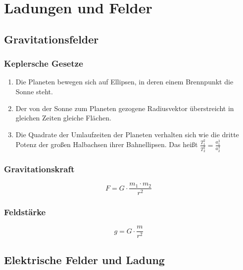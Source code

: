 \documentclass[a4paper]{article}
\begin{document}
	
	\section{Ladungen und Felder}	
		\subsection{Gravitationsfelder}
			\subsubsection{Keplersche Gesetze}
	
				\begin{enumerate}
					\item Die Planeten bewegen sich auf Ellipsen, in deren einem Brennpunkt die Sonne steht.
					\item Der von der Sonne zum Planeten gezogene Radiusvektor überstreicht in gleichen Zeiten gleiche Flächen.
					\item Die Quadrate der Umlaufzeiten der Planeten verhalten sich wie die dritte Potenz der großen Halbachsen ihrer Bahnellipsen. Das heißt $\frac{T_1^2}{T_2^2} = \frac{a_1^3}{a_2^3}$
				\end{enumerate}

			\subsubsection{Gravitationskraft}
	
				\begin{equation}
					F=G\cdot\frac{m_1\cdot m_2}{r^2}
				\end{equation}
	
			\subsubsection{Feldstärke}
	
				\begin{equation}
					g=G\cdot\frac{m}{r^2}
				\end{equation}
	
		\subsection{Elektrische Felder und Ladung}
\end{document}
